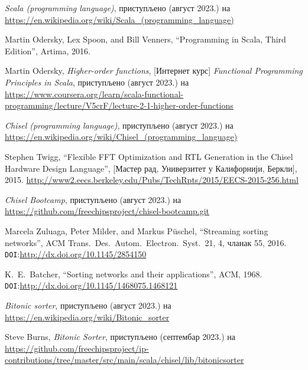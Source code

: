 \documentclass[12pt, a4paper]{article}
\theoremstyle{definition}
\begin{document}
\begin{thebibliography}{99}

\textit{Scala (programming language)}, приступљено (август 2023.) на
\url{https://en.wikipedia.org/wiki/Scala_(programming_language)}

  Martin Odersky, Lex Spoon, and Bill Venners,
  ``Programming in Scala, Third Edition'',
  Artima, 2016.

Martin Odersky, \textit{Higher-order functions}, [Интернет курс] \textit{Functional Programming Principles in Scala}, приступљено (август 2023.) на
\url{https://www.coursera.org/learn/scala-functional-programming/lecture/V5crF/lecture-2-1-higher-order-functions}

\textit{Chisel (programming language)}, приступљено (август 2023.) на
\url{https://en.wikipedia.org/wiki/Chisel_(programming_language)}


  Stephen Twigg,
  ``Flexible FFT Optimization and RTL Generation in the Chisel Hardware Design Language'', [Мастер рад, Универзитет у Калифорнији, Беркли], 2015.
  \url{http://www2.eecs.berkeley.edu/Pubs/TechRpts/2015/EECS-2015-256.html}

\textit{Chisel Bootcamp}, приступљено (август 2023.) на
\url{https://github.com/freechipsproject/chisel-bootcamp.git}

  Marcela Zuluaga, Peter Milder, and Markus Püschel,
  ``Streaming sorting networks'',
  ACM Trans.\ Des.\ Autom.\ Electron.\ Syst.\ 21, 4, чланак 55, 2016.
  \verb+DOI+:\url{http://dx.doi.org/10.1145/2854150}

  K.\ E.\ Batcher,
  ``Sorting networks and their applications'',
  ACM, 1968.
  \verb+DOI+:\url{http://dx.doi.org/10.1145/1468075.1468121}

\textit{Bitonic sorter}, приступљено (август 2023.) на
\url{https://en.wikipedia.org/wiki/Bitonic_sorter}

Steve Burns,
\textit{Bitonic Sorter}, приступљено (септембар 2023.) на
\url{https://github.com/freechipsproject/ip-contributions/tree/master/src/main/scala/chisel/lib/bitonicsorter}


\end{thebibliography}
\end{document}
